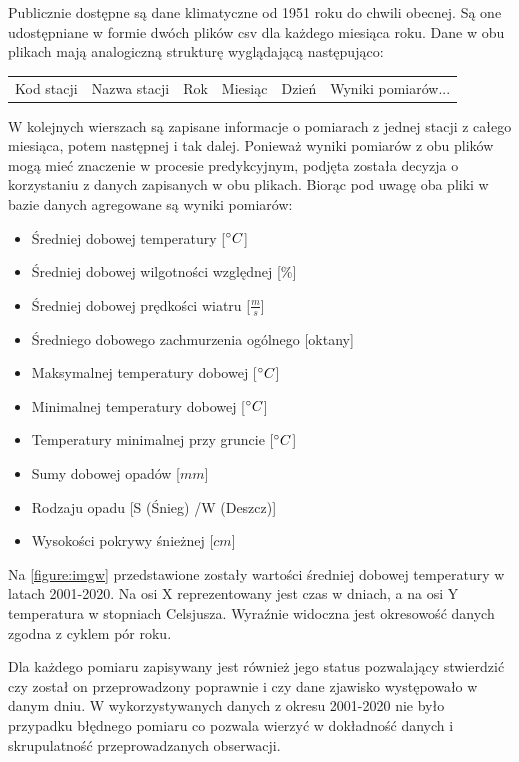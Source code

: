 \documentclass[10pt,a4paper]{article}
\begin{document}
Publicznie dostępne są dane klimatyczne od 1951 roku do chwili obecnej. Są one udostępniane w formie dwóch plików csv dla każdego miesiąca roku. Dane w obu plikach mają analogiczną strukturę wyglądającą następująco:
\begin{center}
	\begin{tabular}{|c|c|c|c|c|c}
		Kod stacji & Nazwa stacji & Rok & Miesiąc & Dzień & Wyniki pomiarów...
	\end{tabular}
\end{center}
W kolejnych wierszach są zapisane informacje o pomiarach z jednej stacji z całego miesiąca, potem następnej i tak dalej. Ponieważ wyniki pomiarów z obu plików mogą mieć znaczenie w procesie predykcyjnym, podjęta została decyzja o korzystaniu z danych zapisanych w obu plikach. Biorąc pod uwagę oba pliki w bazie danych agregowane są wyniki pomiarów: 
\begin{itemize}
	\item Średniej dobowej temperatury [$\degree C$]
	\item Średniej dobowej wilgotności względnej [\%]
	\item Średniej dobowej prędkości wiatru [$\frac{m}{s}$]
	\item Średniego dobowego zachmurzenia ogólnego [oktany]
	\item Maksymalnej temperatury dobowej [$\degree C$]
	\item Minimalnej temperatury dobowej [$\degree C$]
	\item Temperatury minimalnej przy gruncie [$\degree C$]
	\item Sumy dobowej opadów [$mm$]
	\item Rodzaju opadu [S (Śnieg) /W (Deszcz)]
	\item Wysokości pokrywy śnieżnej [$cm$]
\end{itemize}
Na \autoref{figure:imgw} przedstawione zostały wartości średniej dobowej temperatury w latach 2001-2020. Na osi X reprezentowany jest czas w dniach, a na osi Y temperatura w stopniach Celsjusza. Wyraźnie widoczna jest okresowość danych zgodna z cyklem pór roku.  

Dla każdego pomiaru zapisywany jest również jego status pozwalający stwierdzić czy został on przeprowadzony poprawnie i czy dane zjawisko występowało w danym dniu. W wykorzystywanych danych z okresu 2001-2020 nie było przypadku błędnego pomiaru co pozwala wierzyć w dokładność danych i skrupulatność przeprowadzanych obserwacji. 
\end{document}
